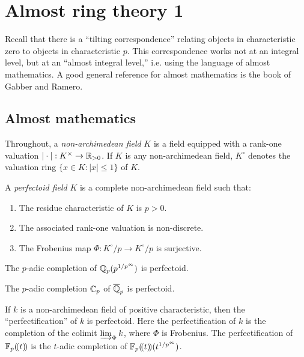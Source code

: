 
\section{Almost ring theory 1}





Recall that there is a ``tilting correspondence'' relating objects in characteristic 
zero to objects in characteristic $p$. This correspondence works not at an integral 
level, but at an ``almost integral level,'' i.e. using the language of almost 
mathematics. A good general reference for almost mathematics is the book \cite{gr03} 
of Gabber and Ramero. 





\subsection{Almost mathematics}

Throughout, a \emph{non-archimedean field} $K$ is a field equipped with a 
rank-one valuation $|\cdot|:K^\times \to \mathbb{R}_{>0}$. If $K$ is any 
non-archimedean field, $K^\circ$ denotes the valuation ring 
$\{x\in K:|x|\leqslant 1\}$ of $K$. 

\begin{definition}
A \emph{perfectoid field} $K$ is a complete non-archimedean field such that: 
\begin{enumerate}
  \item The residue characteristic of $K$ is $p>0$. 
  \item The associated rank-one valuation is non-discrete. 
  \item The Frobenius map $\Phi:K^\circ/p \to K^\circ/p$ is surjective. 
\end{enumerate}
\end{definition}

\begin{example}
The $p$-adic completion of $\mathbb{Q}_p(p^{1/p^\infty})$ is perfectoid. 
\end{example} 

\begin{example}
The $p$-adic completion $\mathbb{C}_p$ of $\overline{\mathbb{Q}}_p$ is perfectoid. 
\end{example}

\begin{example}
If $k$ is a non-archimedean field of positive characteristic, then the 
``perfectification'' of $k$ is perfectoid. Here the perfectification of 
$k$ is the completion of the colimit $\varinjlim_\Phi k$, where $\Phi$ is 
Frobenius. The perfectification of $\mathbb{F}_p(\!( {t} )\!)$ is the $t$-adic completion of 
$\mathbb{F}_p(\!( {t} )\!)(t^{1/p^\infty})$. 
\end{example}

